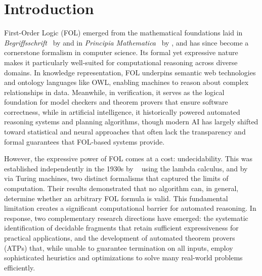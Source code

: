 \newpage\pagestyle{introduction}


\chapter*{Introduction}

First-Order Logic (FOL) emerged from the mathematical foundations laid in \emph{Begriffsschrift}~\cite{frege1879} by \citeauthor{frege1879} and in \emph{Principia Mathematica}~\cite{russell1910} by \citeauthor{russell1910}, and has since become a cornerstone formalism in computer science.
Its formal yet expressive nature makes it particularly well-suited for computational reasoning across diverse domains.
In knowledge representation, FOL underpins semantic web technologies and ontology languages like OWL, enabling machines to reason about complex relationships in data.
Meanwhile, in verification, it serves as the logical foundation for model checkers and theorem provers that ensure software correctness, while in artificial intelligence, it historically powered automated reasoning systems and planning algorithms, though modern AI has largely shifted toward statistical and neural approaches that often lack the transparency and formal guarantees that FOL-based systems provide.

However, the expressive power of FOL comes at a cost: undecidability.
This was established independently in the 1930s by \citeauthor{church1936}~\cite{church1936} using the lambda calculus, and by \citeauthor{turing1936}~\cite{turing1936} via Turing machines, two distinct formalisms that captured the limits of computation.
Their results demonstrated that no algorithm can, in general, determine whether an arbitrary FOL formula is valid. This fundamental limitation creates a significant computational barrier for automated reasoning.
In response, two complementary research directions have emerged: the systematic identification of decidable fragments that retain sufficient expressiveness for practical applications, and the development of automated theorem provers (ATPs) that, while unable to guarantee termination on all inputs, employ sophisticated heuristics and optimizations to solve many real-world problems efficiently.

